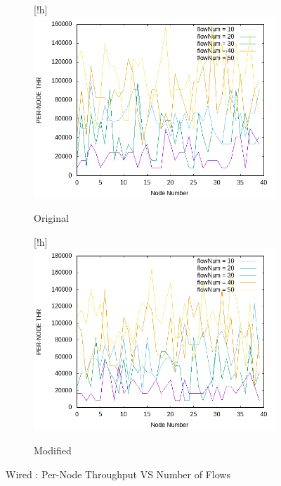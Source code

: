     \begin{figure}[!h]
    	\centering
    	
    	\begin{subfigure}{0.9\textwidth}[!h] %
    		\includegraphics[width=.95\textwidth]{Pictures/Wired/Original/PER-NODETHRVSflowNum.png}
    		\caption{Original} %
    	\end{subfigure}
    	
    	\vspace{1em} %
    	
    	\begin{subfigure}{0.9\textwidth}[!h] %
    		\includegraphics[width=.95\textwidth]{Pictures/Wired/Modified/PER-NODETHRVSflowNum.png}
    		\caption{Modified} %
    	\end{subfigure}
    	
    	\caption{Wired : Per-Node Throughput VS Number of Flows} %
    \end{figure}
    
